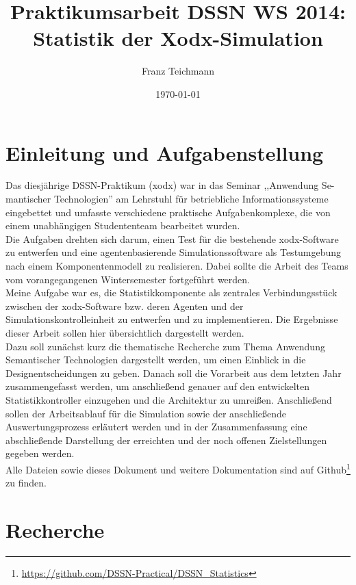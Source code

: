\documentclass{article}
\title{Praktikumsarbeit DSSN WS 2014: \\ Statistik der Xodx-Simulation}
\author{Franz Teichmann}
\date{\today}
\begin{document}
\maketitle

\tableofcontents
\newpage


\section{Einleitung und Aufgabenstellung}

Das diesjährige DSSN-Praktikum (xodx) war in das Seminar ,,Anwendung Se-mantischer Technologien'' am Lehrstuhl für betriebliche Informationssysteme eingebettet und umfasste verschiedene praktische Aufgabenkomplexe, die von einem unabhängigen Studententeam bearbeitet wurden.\\
Die Aufgaben drehten sich darum, einen Test für die bestehende xodx-Software zu entwerfen und eine agentenbasierende Simulationssoftware als Testumgebung nach einem Komponentenmodell zu realisieren. Dabei sollte die Arbeit des Teams vom vorangegangenen Wintersemester fortgeführt werden.\\
Meine Aufgabe war es, die Statistikkomponente als zentrales Verbindungsstück zwischen der xodx-Software bzw. deren Agenten und der Simulationskontrolleinheit zu entwerfen und zu implementieren. Die Ergebnisse dieser Arbeit sollen hier übersichtlich dargestellt werden.\\
Dazu soll zunächst kurz die thematische Recherche zum Thema Anwendung Semantischer Technologien dargestellt werden, um einen Einblick in die Designentscheidungen zu geben. Danach soll die Vorarbeit aus dem letzten Jahr zusammengefasst werden, um anschließend genauer auf den entwickelten Statistikkontroller einzugehen und die Architektur zu umreißen. Anschließend sollen der Arbeitsablauf für die Simulation sowie der anschließende Auswertungsprozess erläutert werden und in der Zusammenfassung eine abschließende Darstellung der erreichten und der noch offenen Zielstellungen gegeben werden.\\
Alle Dateien sowie dieses Dokument und weitere Dokumentation sind auf Github\footnote{\url{https://github.com/DSSN-Practical/DSSN_Statistics}} zu finden.

\section{Recherche}
\end{document}
